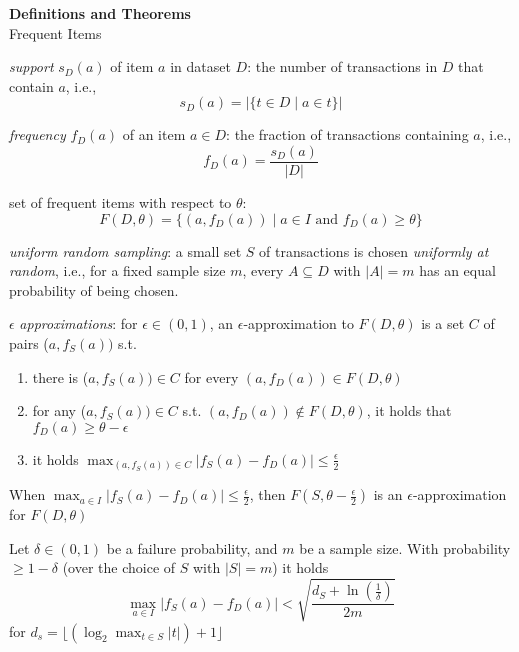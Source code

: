 \noindent
\textbf{\LARGE Definitions and Theorems} \\
\large Frequent Items


\normalsize

 \textit{support} $s_D(a)$ of item $a$ in dataset $D$: the number of transactions in $D$ that contain $a$, i.e., 
\[ s_D(a) = |\{t \in D \mid a \in t\}| \]

 \textit{frequency} $f_D(a)$ of an item $a \in D$: the fraction of transactions containing $a$, i.e.,
\[ f_D(a) = \frac{s_D(a)}{|D|} \]

 set of frequent items with respect to $\theta$: 
\[ F(D, \theta) = \{(a, f_D(a)) \mid a \in I \text{ and } f_D(a) \ge \theta \} \]

 \textit{uniform random sampling}: a small set $S$ of transactions is chosen \textit{uniformly at random}, i.e., for a fixed sample size $m$, every $A \subseteq D$ with $|A| = m$ has an equal probability of being chosen.

 $\epsilon$ \textit{approximations}: for $\epsilon \in (0,1)$, an $\epsilon$-approximation to $F(D, \theta)$ is a set $C$ of pairs ($a, f_S(a))$ s.t.
\begin{enumerate}
    \item there is ($a, f_S(a)) \in C$ for every $(a, f_D(a)) \in F(D, \theta)$
    \item for any ($a, f_S(a)) \in C$ s.t. $(a, f_D(a)) \notin F(D, \theta)$, it holds that $f_D(a) \ge \theta - \epsilon$
    \item it holds $\max_{(a, f_S(a)) \in C} |f_S(a) - f_D(a)| \le \frac{\epsilon}{2} $
\end{enumerate}

\thm When $\max_{a \in I}|f_S(a) - f_D(a)| \le \frac{\epsilon}{2}$, then $F(S, \theta - \frac{\epsilon}{2})$ is an $\epsilon$-approximation for $F(D, \theta)$

\thm Let $\delta \in (0,1)$ be a failure probability, and $m$ be a sample size. With probability $\ge 1 - \delta$ (over the choice of $S$ with $|S| = m$) it holds
\[ \max_{a \in I}|f_S(a) - f_D(a)| < \sqrt{\frac{d_S + \ln(\frac{1}{\delta})}{2m}} \]
for $d_s = \lfloor( \log_2 \max_{t \in S}|t|) + 1 \rfloor $